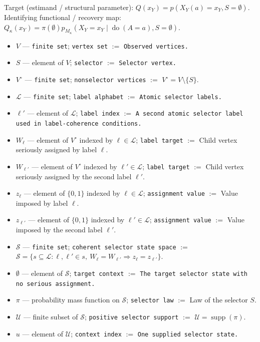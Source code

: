 \documentclass{article}
\begin{document}
Target (estimand / structural parameter): \(Q(x_Y)=p(X_Y(a)=x_Y,S=\emptyset)\).
Identifying functional / recovery map: \(Q_\kappa(x_Y)=\pi(\emptyset)p_{M_\kappa}(X_Y=x_Y\mid\operatorname{do}(A=a),S=\emptyset)\).
\begin{itemize}
  \item \(V\) --- \texttt{finite set}; \texttt{vertex set} $:=$ \texttt{Observed vertices.}
  \item \(S\) --- element of \(V\); \texttt{selector} $:=$ \texttt{Selector vertex.}
  \item \(V^\circ\) --- \texttt{finite set}; \texttt{nonselector vertices} $:=$ \(V^\circ=V\setminus\{S\}\).
  \item \(\mathcal L\) --- \texttt{finite set}; \texttt{label alphabet} $:=$ \texttt{Atomic selector labels.}
  \item \(\ell'\) --- element of \(\mathcal L\); \texttt{label index} $:=$ \texttt{A second atomic selector label used in label-coherence conditions.}
  \item \(W_\ell\) --- element of \(V^\circ\) indexed by \(\ell\in\mathcal L\); \texttt{label target} $:=$ Child vertex seriously assigned by label \(\ell\).
  \item \(W_{\ell'}\) --- element of \(V^\circ\) indexed by \(\ell'\in\mathcal L\); \texttt{label target} $:=$ Child vertex seriously assigned by the second label \(\ell'\).
  \item \(z_\ell\) --- element of \(\{0,1\}\) indexed by \(\ell\in\mathcal L\); \texttt{assignment value} $:=$ Value imposed by label \(\ell\).
  \item \(z_{\ell'}\) --- element of \(\{0,1\}\) indexed by \(\ell'\in\mathcal L\); \texttt{assignment value} $:=$ Value imposed by the second label \(\ell'\).
  \item \(\mathcal S\) --- \texttt{finite set}; \texttt{coherent selector state space} $:=$ \(\mathcal S=\{s\subseteq\mathcal L:\ell,\ell'\in s,\ W_\ell=W_{\ell'}\Rightarrow z_\ell=z_{\ell'}\}\).
  \item \(\emptyset\) --- element of \(\mathcal S\); \texttt{target context} $:=$ \texttt{The target selector state with no serious assignment.}
  \item \(\pi\) --- probability mass function on \(\mathcal S\); \texttt{selector law} $:=$ Law of the selector \(S\).
  \item \(\mathcal U\) --- finite subset of \(\mathcal S\); \texttt{positive selector support} $:=$ \(\mathcal U=\operatorname{supp}(\pi)\).
  \item \(u\) --- element of \(\mathcal U\); \texttt{context index} $:=$ \texttt{One supplied selector state.}

\end{itemize}
\end{document}
